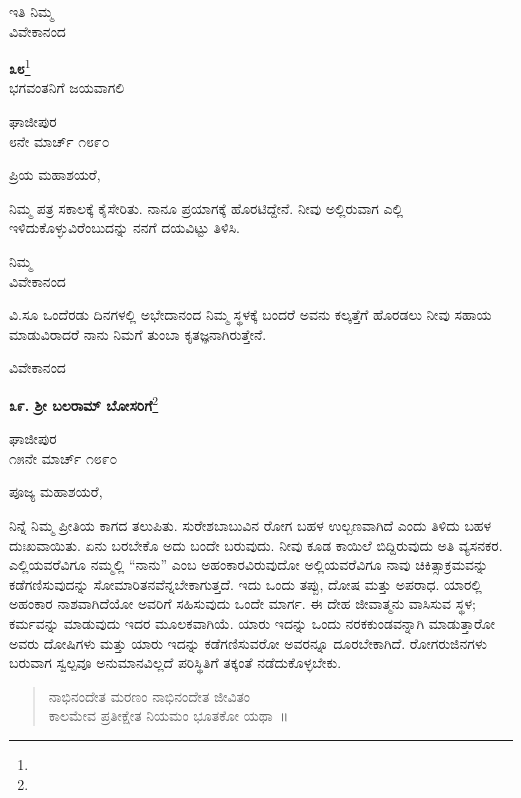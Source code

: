 {\flushright
ಇತಿ ನಿಮ್ಮ\\ವಿವೇಕಾನಂದ\par}

\begin{center}
\textbf{೩೮}\footnote{}\\ ಭಗವಂತನಿಗೆ ಜಯವಾಗಲಿ
\end{center}

\vspace{-0.5cm}

\begin{flushright}
ಘಾಜೀಪುರ\\೮ನೇ ಮಾರ್ಚ್ ೧೮೯೦
\end{flushright}

\noindent
ಪ್ರಿಯ ಮಹಾಶಯರೆ,

ನಿಮ್ಮ ಪತ್ರ ಸಕಾಲಕ್ಕೆ ಕೈಸೇರಿತು. ನಾನೂ ಪ್ರಯಾಗಕ್ಕೆ ಹೊರಟಿದ್ದೇನೆ. ನೀವು ಅಲ್ಲಿರುವಾಗ ಎಲ್ಲಿ ಇಳಿದುಕೊಳ್ಳುವಿರೆಂಬುದನ್ನು ನನಗೆ ದಯವಿಟ್ಟು ತಿಳಿಸಿ.

\vspace{-0.5cm}

{\flushright
ನಿಮ್ಮ\\ವಿವೇಕಾನಂದ\par}

ವಿ.ಸೂ \enginline{-}ಒಂದೆರಡು ದಿನಗಳಲ್ಲಿ ಅಭೇದಾನಂದ ನಿಮ್ಮ ಸ್ಥಳಕ್ಕೆ ಬಂದರೆ ಅವನು ಕಲ್ಕತ್ತೆಗೆ ಹೊರಡಲು ನೀವು ಸಹಾಯ ಮಾಡುವಿರಾದರೆ ನಾನು ನಿಮಗೆ ತುಂಬಾ ಕೃತಜ್ಞನಾಗಿರುತ್ತೇನೆ.

\vspace{-0.5cm}

{\flushright
ವಿವೇಕಾನಂದ\par}

\begin{center}
\textbf{೩೯. ಶ‍್ರೀ ಬಲರಾಮ್ ಬೋಸರಿಗೆ}\footnote{}
\end{center}

\vspace{-0.5cm}

\begin{flushright}
ಘಾಜೀಪುರ\\೧೫ನೇ ಮಾರ್ಚ್ ೧೮೯೦
\end{flushright}

\noindent
ಪೂಜ್ಯ ಮಹಾಶಯರೆ,

ನಿನ್ನೆ ನಿಮ್ಮ ಪ್ರೀತಿಯ ಕಾಗದ ತಲುಪಿತು. ಸುರೇಶಬಾಬುವಿನ ರೋಗ ಬಹಳ ಉಲ್ಬಣವಾಗಿದೆ ಎಂದು ತಿಳಿದು ಬಹಳ ದುಃಖವಾಯಿತು. ಏನು ಬರಬೇಕೊ ಅದು ಬಂದೇ ಬರುವುದು. ನೀವು ಕೂಡ ಕಾಯಿಲೆ ಬಿದ್ದಿರುವುದು ಅತಿ ವ್ಯಸನಕರ. ಎಲ್ಲಿಯವರೆವಿಗೂ ನಮ್ಮಲ್ಲಿ “ನಾನು” ಎಂಬ ಅಹಂಕಾರವಿರುವುದೋ ಅಲ್ಲಿಯವರೆವಿಗೂ ನಾವು ಚಿಕಿತ್ಸಾಕ್ರಮವನ್ನು ಕಡೆಗಣಿಸುವುದನ್ನು ಸೋಮಾರಿತನವೆನ್ನಬೇಕಾಗುತ್ತದೆ. ಇದು ಒಂದು ತಪ್ಪು, ದೋಷ ಮತ್ತು ಅಪರಾಧ. ಯಾರಲ್ಲಿ ಅಹಂಕಾರ ನಾಶವಾಗಿದೆಯೋ ಅವರಿಗೆ ಸಹಿಸುವುದು ಒಂದೇ ಮಾರ್ಗ. ಈ ದೇಹ ಜೀವಾತ್ಮನು ವಾಸಿಸುವ ಸ್ಥಳ; ಕರ್ಮವನ್ನು ಮಾಡುವುದು ಇದರ ಮೂಲಕವಾಗಿಯೆ. ಯಾರು ಇದನ್ನು ಒಂದು ನರಕಕುಂಡವನ್ನಾಗಿ ಮಾಡುತ್ತಾರೋ ಅವರು ದೋಷಿಗಳು ಮತ್ತು ಯಾರು ಇದನ್ನು ಕಡೆಗಣಿಸುವರೋ ಅವರನ್ನೂ ದೂರಬೇಕಾಗಿದೆ. ರೋಗರುಜಿನಗಳು ಬರುವಾಗ ಸ್ವಲ್ಪವೂ ಅನುಮಾನವಿಲ್ಲದೆ ಪರಿಸ್ಥಿತಿಗೆ ತಕ್ಕಂತೆ ನಡೆದುಕೊಳ್ಳಬೇಕು.
\begin{verse}
 ನಾಭಿನಂದೇತ ಮರಣಂ ನಾಭಿನಂದೇತ ಜೀವಿತಂ\\
 ಕಾಲಮೇವ ಪ್ರತೀಕ್ಷೇತ ನಿಯಮಂ ಭೂತಕೋ ಯಥಾ~॥ 
\end{verse}

